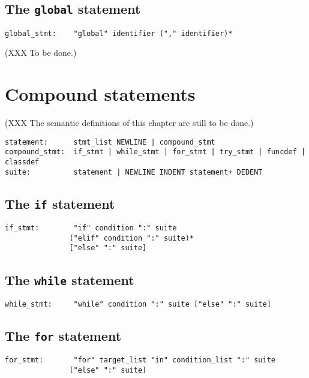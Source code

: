 \section{The {\tt global} statement}

\begin{verbatim}
global_stmt:    "global" identifier ("," identifier)*
\end{verbatim}

(XXX To be done.)

\chapter{Compound statements}

(XXX The semantic definitions of this chapter are still to be done.)

\begin{verbatim}
statement:      stmt_list NEWLINE | compound_stmt
compound_stmt:  if_stmt | while_stmt | for_stmt | try_stmt | funcdef | classdef
suite:          statement | NEWLINE INDENT statement+ DEDENT
\end{verbatim}

\section{The {\tt if} statement}

\begin{verbatim}
if_stmt:        "if" condition ":" suite
               ("elif" condition ":" suite)*
               ["else" ":" suite]
\end{verbatim}

\section{The {\tt while} statement}

\begin{verbatim}
while_stmt:     "while" condition ":" suite ["else" ":" suite]
\end{verbatim}

\section{The {\tt for} statement}

\begin{verbatim}
for_stmt:       "for" target_list "in" condition_list ":" suite
               ["else" ":" suite]
\end{verbatim}

